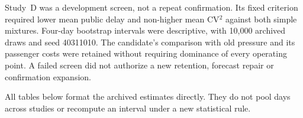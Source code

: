 Study~D was a development screen, not a repeat confirmation. Its fixed criterion required lower mean public delay and non-higher mean CV$^2$ against both simple mixtures. Four-day bootstrap intervals were descriptive, with 10,000 archived draws and seed 40311010. The candidate's comparison with old pressure and its passenger costs were retained without requiring dominance of every operating point. A failed screen did not authorize a new retention, forecast repair or confirmation expansion.

All tables below format the archived estimates directly. They do not pool days across studies or recompute an interval under a new statistical rule.
